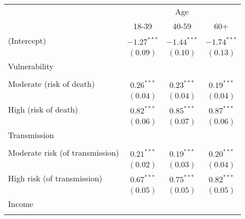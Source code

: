 
\begin{table}
\begin{center}
\begin{scriptsize}
\begin{tabular}{l c c c}
\hline
 & \multicolumn{3}{c}{Age} \\
\cline{2-4}
 & 18-39 & 40-59 & 60+ \\
\hline
(Intercept)                                     & $-1.27^{***}$ & $-1.44^{***}$ & $-1.74^{***}$ \\
                                                & $(0.09)$      & $(0.10)$      & $(0.13)$      \\
Vulnerability                                   &               &               &               \\
                                                &               &               &               \\
\quad Moderate (risk of death)                  & $0.26^{***}$  & $0.23^{***}$  & $0.19^{***}$  \\
                                                & $(0.04)$      & $(0.04)$      & $(0.04)$      \\
\quad High (risk of death)                      & $0.82^{***}$  & $0.85^{***}$  & $0.87^{***}$  \\
                                                & $(0.06)$      & $(0.07)$      & $(0.06)$      \\
Transmission                                    &               &               &               \\
                                                &               &               &               \\
\quad Moderate risk (of transmission)           & $0.21^{***}$  & $0.19^{***}$  & $0.20^{***}$  \\
                                                & $(0.02)$      & $(0.03)$      & $(0.04)$      \\
\quad High risk (of transmission)               & $0.67^{***}$  & $0.75^{***}$  & $0.82^{***}$  \\
                                                & $(0.05)$      & $(0.05)$      & $(0.05)$      \\
Income                                          &               &               &               \\
                                                &               &               &               \\

\end{tabular}
\end{scriptsize}
\end{center}
\end{table}
